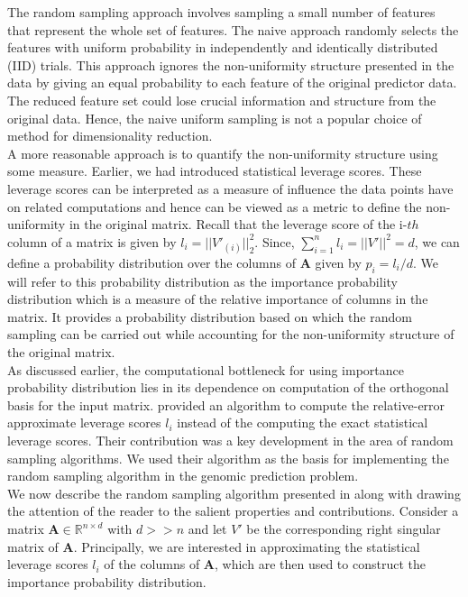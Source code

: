 The random sampling approach involves sampling a small number of features that represent the whole set of features. The naive approach randomly selects the features with uniform probability in independently and identically distributed (IID) trials. This approach ignores the non-uniformity structure presented in the data by giving an equal probability to each feature of the original predictor data. The reduced feature set could lose crucial information and structure from the original data. Hence, the naive uniform  sampling is not a popular choice of method for dimensionality reduction.\\

A more reasonable approach is to quantify the non-uniformity structure using some measure. Earlier, we had introduced statistical leverage scores. These leverage scores can be interpreted as a measure of influence the data points have on related computations and hence can be viewed as a metric to define the non-uniformity in the original matrix. Recall that the leverage score of the i-$th$ column of a matrix is given by $l_i = ||V'_(i)||_2^2$.
Since, $\sum_{i=1}^n l_i = ||V'||^2 = d$, we can define a probability distribution over the columns of $\textbf{A}$ given by $p_i = l_i/d$. We will refer to this probability distribution as the importance probability distribution which is a measure of the relative importance of columns in the matrix. It provides a probability distribution based on which the random sampling can be carried out while accounting for the non-uniformity structure of the original matrix. \\

As discussed earlier, the computational bottleneck for using importance probability distribution lies in its dependence on computation of the orthogonal basis for the input matrix. \cite{drineas_fast_2012} provided an algorithm to compute the relative-error approximate leverage scores $l_i$ instead of the computing the exact statistical leverage scores. Their contribution was a key development in the area of random sampling algorithms. We used their algorithm as the basis for implementing the random sampling algorithm in the genomic prediction problem. \\

We now describe the random sampling algorithm presented in \cite{drineas_fast_2012} along with drawing the attention of the reader to the salient properties and contributions. Consider a matrix $\textbf{A} \in \mathds{R}^{n \times d}$ with $d >> n$ and let $V'$ be the corresponding right singular matrix of $\textbf{A}$. Principally, we are interested in approximating the statistical leverage scores $l_i$ of the columns of $\textbf{A}$, which are then used to construct the importance probability distribution.

